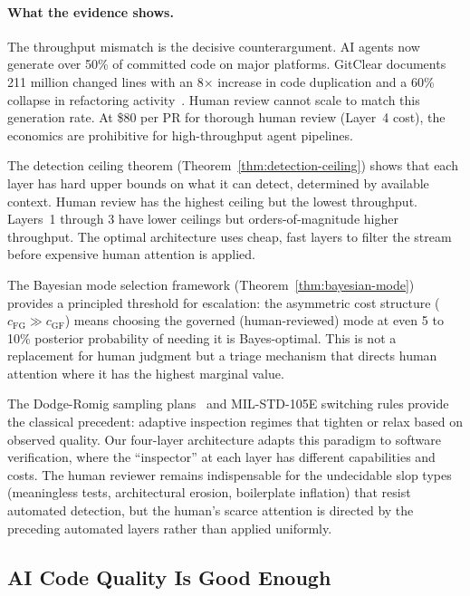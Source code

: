 \documentclass[11pt, a4paper, logo, copyright]{googledeepmind}
\begin{document}
\paragraph{What the evidence shows.}
The throughput mismatch is the decisive counterargument. AI agents now generate over 50\% of committed code on major platforms. GitClear documents 211 million changed lines with an 8$\times$ increase in code duplication and a 60\% collapse in refactoring activity~\citep{gitclear2025}. Human review cannot scale to match this generation rate. At \$80 per PR for thorough human review (Layer~4 cost), the economics are prohibitive for high-throughput agent pipelines.

The detection ceiling theorem (Theorem~\ref{thm:detection-ceiling}) shows that each layer has hard upper bounds on what it can detect, determined by available context. Human review has the highest ceiling but the lowest throughput. Layers~1 through 3 have lower ceilings but orders-of-magnitude higher throughput. The optimal architecture uses cheap, fast layers to filter the stream before expensive human attention is applied.

The Bayesian mode selection framework (Theorem~\ref{thm:bayesian-mode}) provides a principled threshold for escalation: the asymmetric cost structure ($c_{\mathrm{FG}} \gg c_{\mathrm{GF}}$) means choosing the governed (human-reviewed) mode at even 5 to 10\% posterior probability of needing it is Bayes-optimal. This is not a replacement for human judgment but a triage mechanism that directs human attention where it has the highest marginal value.

The Dodge-Romig sampling plans~\citep{dodge1929method} and MIL-STD-105E switching rules provide the classical precedent: adaptive inspection regimes that tighten or relax based on observed quality. Our four-layer architecture adapts this paradigm to software verification, where the ``inspector'' at each layer has different capabilities and costs. The human reviewer remains indispensable for the undecidable slop types (meaningless tests, architectural erosion, boilerplate inflation) that resist automated detection, but the human's scarce attention is directed by the preceding automated layers rather than applied uniformly.


\subsection{AI Code Quality Is Good Enough}
\label{sec:contrarian-quality}
\end{document}
